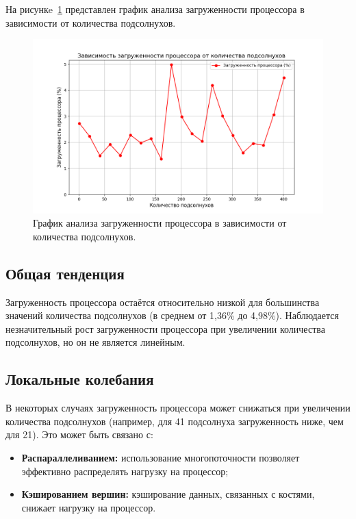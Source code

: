 На рисункe~\ref{images:graph_2} представлен график анализа загруженности процессора в зависимости от количества подсолнухов.
\begin{figure}[H]
    \centering
    \includegraphics[width=155mm]{images/graph_2}
    \caption{График анализа загруженности процессора в зависимости от количества подсолнухов.}
    \label{images:graph_2}
\end{figure}

\subsection{Общая тенденция}
Загруженность процессора остаётся относительно низкой для большинства значений количества подсолнухов (в среднем от 1,36\% до 4,98\%). Наблюдается незначительный рост загруженности процессора при увеличении количества подсолнухов, но он не является линейным.

\subsection{Локальные колебания}
В некоторых случаях загруженность процессора может снижаться при увеличении количества подсолнухов (например, для 41 подсолнуха загруженность ниже, чем для 21). Это может быть связано с:

\begin{itemize}
    \item \textbf{Распараллеливанием:} использование многопоточности позволяет эффективно распределять нагрузку на процессор;
    \item \textbf{Кэшированием вершин:} кэширование данных, связанных с костями, снижает нагрузку на процессор.
\end{itemize}

